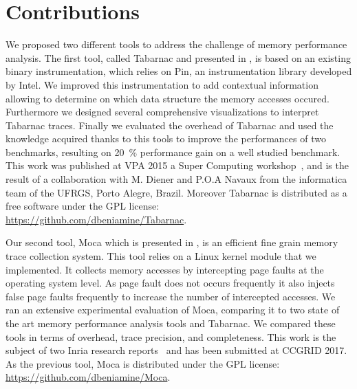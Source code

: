 \section{Contributions}

We proposed two different tools to address the challenge of memory performance analysis.
The first tool, called \gls{Tabarnac} and presented in , is based on an existing binary instrumentation, which relies on \gls{Pin}, an instrumentation library developed by \gls{Intel}.
We improved this instrumentation to add contextual information allowing to determine on which data structure the memory accesses occured.
Furthermore we designed several comprehensive visualizations to interpret \gls{Tabarnac} traces.
Finally we evaluated the overhead of \gls{Tabarnac} and used the knowledge acquired thanks to this tools to improve the performances of two benchmarks, resulting on \SI{20}{\%} performance gain on a well studied benchmark.
This work was published at \gls{VPA} 2015 a Super Computing workshop~\cite{Beniamine15TABARNAC}, and is the result of a collaboration with M. Diener and P.O.A Navaux from the informatica team of the \gls{UFRGS}, Porto Alegre, Brazil.
Moreover \gls{Tabarnac} is distributed as a free software under the \gls{GPL} license:\\
\url{https://github.com/dbeniamine/Tabarnac}.

Our second tool, \gls{Moca} which is presented in , is an efficient fine grain memory trace collection system.
This tool relies on a \gls{Linux} kernel module that we implemented.
It collects memory accesses by intercepting page faults at the operating system level.
As page fault does not occurs frequently it also injects false page faults frequently to increase the number of intercepted accesses.
We ran an extensive experimental evaluation of \gls{Moca}, comparing it to two state of the art memory performance analysis tools and \gls{Tabarnac}.
We compared these tools in terms of overhead, trace precision, and completeness.
This work is the subject of two Inria research reports~\cite{Beniamine15Memory,Beniamine16Moca} and has been submitted at \gls{CCGRID} 2017.
As the previous tool, \gls{Moca} is distributed under the \gls{GPL} license:\\
\url{https://github.com/dbeniamine/Moca}.

